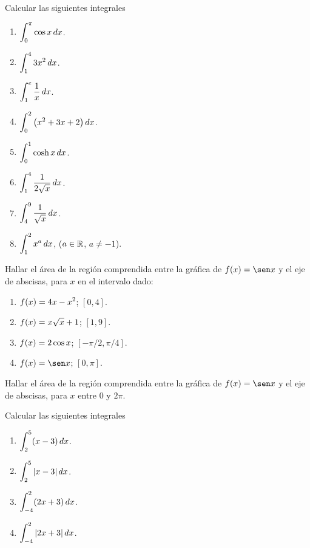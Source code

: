 \item Calcular las siguientes integrales
\begin{multicols}{2}
  \begin{enumerate}
    \item $\displaystyle \int_0^\pi \cos x \,dx$.
    \item $\displaystyle \int_1^4 3 x^2 \,dx$.
    \item $\displaystyle \int_1^e \frac1x \,dx$.
    \item $\displaystyle \int_0^2 \big( x^2+3x+2\big) \,dx$.
    \item $\displaystyle \int_0^1 \cosh x \,dx$.
    \item $\displaystyle \int_1^4 \frac{1}{2\sqrt{x}} \,dx$.
    \item $\displaystyle \int_4^9 \frac{1}{\sqrt x}\,dx$.
    \item $\displaystyle \int_1^2 x^a \,dx$, ($a\in \mathbb{R}$, $a\neq -1$).
  \end{enumerate}
\end{multicols}
\item Hallar el área de la región comprendida entre la gráfica de $f(x)=\sen x$ y el eje de abscisas, para $x$ en el intervalo dado:
\begin{multicols}{2}
  \begin{enumerate}
    \item $\displaystyle f(x)=4x-x^2$; $[0,4]$.
    \item $\displaystyle f(x)=x\sqrt{x}+1$; $[1,9]$.
    \item $\displaystyle f(x)=2\cos x$; $[-\pi/2,\pi/4]$.
    \item $\D f(x)=\sen x$; $[0,\pi]$.
  \end{enumerate}
\end{multicols}

\item Hallar el área de la región comprendida entre la gráfica de $f(x)=\sen x$ y el eje de abscisas, para $x$ entre $0$ y $2\pi$.

\item Calcular las siguientes integrales
\begin{multicols}{2}
  \begin{enumerate}
    \item $\displaystyle \int_2^5 (x-3) \,dx$.
    \item $\displaystyle \int_2^5 |x-3| \,dx$.
    \item $\displaystyle \int_{-4}^2 (2x+3) \,dx$.
    \item $\displaystyle \int_{-4}^2 |2x+3| \,dx$.
  \end{enumerate}
\end{multicols}

